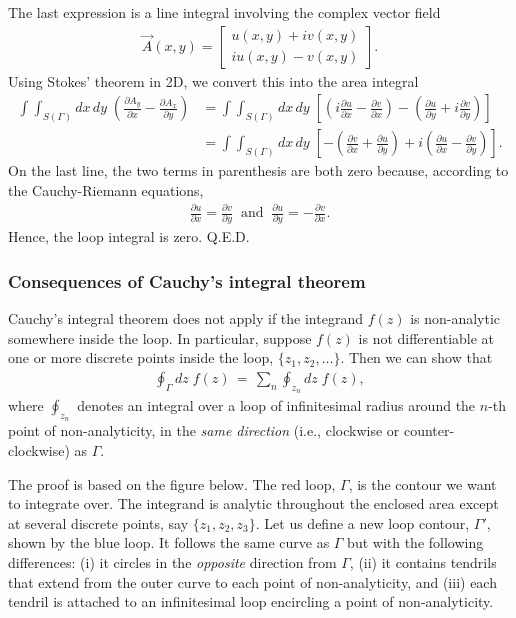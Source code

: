 \documentclass[10pt,a4paper]{article}
\begin{document}
The last expression is a line integral involving the complex vector
field
\begin{align}
  \vec{A}(x,y) = \begin{bmatrix}u(x,y) + i v(x,y) \\ iu(x,y) - v(x,y)\end{bmatrix}.
\end{align}
Using Stokes' theorem in 2D, we convert this into the area integral
\begin{align}
  \int\!\!\!\int_{S(\Gamma)} dx \,dy \; \left(\frac{\partial A_y}{\partial x} - \frac{\partial A_x}{\partial y}\right) &= \int\!\!\!\int_{S(\Gamma)} dx \,dy \; \left[\left(i\frac{\partial u}{\partial x} - \frac{\partial v}{\partial x}\right) - \left(\frac{\partial u}{\partial y} + i \frac{\partial v}{\partial y}\right)\right] \\
  &= \int\!\!\!\int_{S(\Gamma)} dx \,dy \; \left[- \left(\frac{\partial v}{\partial x} + \frac{\partial u}{\partial y} \right) + i\left(\frac{\partial u}{\partial x} - \frac{\partial v}{\partial y}\right)\right].
\end{align}
On the last line, the two terms in parenthesis are both zero because,
according to the Cauchy-Riemann equations,
\begin{align}
  \frac{\partial u}{\partial x} = \frac{\partial v}{\partial y}\;\;\mathrm{and}\;\; \frac{\partial u}{\partial y} = -\frac{\partial v}{\partial x}.
\end{align}
Hence, the loop integral is zero. Q.E.D.

\subsubsection{Consequences of Cauchy's integral theorem}
\label{consequences-of-cauchys-integral-theorem}

Cauchy's integral theorem does not apply if the integrand $f(z)$ is
non-analytic somewhere inside the loop.  In particular, suppose $f(z)$
is not differentiable at one or more discrete points inside the loop, $\{z_1, z_2,
\dots\}$. Then we can show that
\begin{align}
  \oint_\Gamma dz\; f(z) \,=\, \sum_{n} \oint_{z_n} dz\; f(z),
  \label{eq:cit_result}
\end{align}
where $\oint_{z_n}$ denotes an integral over a loop of infinitesimal
radius around the $n$-th point of non-analyticity, in the \textit{same
  direction} (i.e., clockwise or counter-clockwise) as $\Gamma$.

The proof is based on the figure below. The red loop, $\Gamma$, is the
contour we want to integrate over. The integrand is analytic
throughout the enclosed area except at several discrete points, say
$\{z_1, z_2, z_3\}$. Let us define a new loop contour, $\Gamma'$,
shown by the blue loop. It follows the same curve as $\Gamma$ but with
the following differences: (i) it circles in the \textit{opposite}
direction from $\Gamma$, (ii) it contains tendrils that extend from
the outer curve to each point of non-analyticity, and (iii) each
tendril is attached to an infinitesimal loop encircling a point of
non-analyticity.
\end{document}
